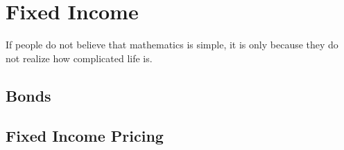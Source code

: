 \chapter{Fixed Income}
 \begin{fquote}If people do not believe that mathematics is simple, it is only because they do not realize how complicated life is.
 \end{fquote}

 \section{Bonds}

\section{Fixed Income Pricing}
